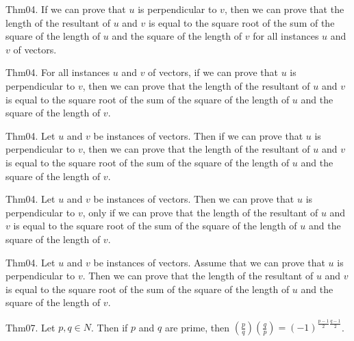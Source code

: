 \documentclass{article}
\begin{document}
Thm04. If we can prove that $u$ is perpendicular to $v$, then we can prove that the length of the resultant of $u$ and $v$ is equal to the square root of the sum of the square of the length of $u$ and the square of the length of $v$ for all instances $u$ and $v$ of vectors.

Thm04. For all instances $u$ and $v$ of vectors, if we can prove that $u$ is perpendicular to $v$, then we can prove that the length of the resultant of $u$ and $v$ is equal to the square root of the sum of the square of the length of $u$ and the square of the length of $v$.

Thm04. Let $u$ and $v$ be instances of vectors. Then if we can prove that $u$ is perpendicular to $v$, then we can prove that the length of the resultant of $u$ and $v$ is equal to the square root of the sum of the square of the length of $u$ and the square of the length of $v$.

Thm04. Let $u$ and $v$ be instances of vectors. Then we can prove that $u$ is perpendicular to $v$, only if we can prove that the length of the resultant of $u$ and $v$ is equal to the square root of the sum of the square of the length of $u$ and the square of the length of $v$.

Thm04. Let $u$ and $v$ be instances of vectors. Assume that we can prove that $u$ is perpendicular to $v$. Then we can prove that the length of the resultant of $u$ and $v$ is equal to the square root of the sum of the square of the length of $u$ and the square of the length of $v$.

Thm07. Let $p , q \in N$. Then if $p$ and $q$ are prime, then $\left(\frac{ p }{ q }\right) \left(\frac{ q }{ p }\right) = (- 1)^ {\frac{ p - 1}{2}\frac{ q - 1}{2}}$.
\end{document}
